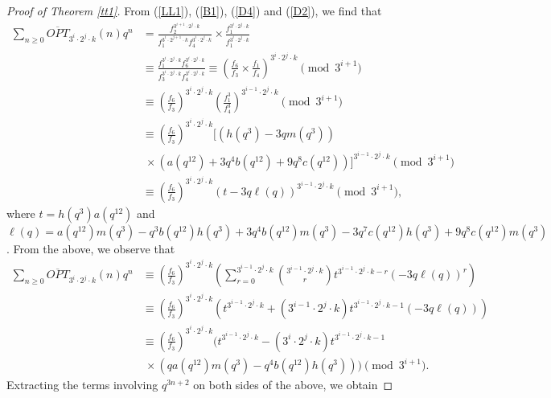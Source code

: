 \documentclass[12pt,reqno,a4paper]{amsart}
\numberwithin{equation}{section}
\begin{document}
 \begin{proof}[Proof of Theorem \ref{tt1}]
    From (\ref{LL1}), (\ref{B1}), (\ref{D4}) and (\ref{D2}), we find that
    \begin{align*}
        \sum_{n\geq 0}\overline{OPT}_{3^i\cdot 2^j\cdot k}(n)q^n&= \frac{f_2^{3^{i+1}\cdot 2^j\cdot k}}{f_1^{3^i\cdot 2^{j+1}\cdot k}f_4^{3^i\cdot 2^j\cdot k}}\times \frac{f_1^{3^i\cdot 2^{j}\cdot k}}{f_1^{3^i\cdot 2^{j}\cdot k}}\\
        &\equiv \frac{f_1^{3^i\cdot 2^{j}\cdot k}f_6^{3^{i}\cdot 2^j\cdot k}}{f_3^{3^i\cdot 2^{j}\cdot k}f_4^{3^i\cdot 2^j\cdot k}}\equiv \left(\frac{f_6}{f_3}\times \frac{f_1}{f_4}\right)^{3^{i}\cdot 2^j\cdot k}\pmod{3^{i+1}}\\
        & \equiv \left(\frac{f_6}{f_3}\right)^{3^{i}\cdot 2^j\cdot k} \left(\frac{f_1^3}{f_4^3}\right)^{3^{i-1}\cdot 2^j\cdot k}\pmod{3^{i+1}}\\
         & \equiv \left(\frac{f_6}{f_3}\right)^{3^{i}\cdot 2^j\cdot k}  \bigg[ (h(q^3)-3qm(q^3))  \\&~\times \left( a(q^{12})+3q^4b(q^{12})+9q^8c(q^{12})\right)\bigg ]^{3^{i-1}\cdot 2^j\cdot k}\pmod{3^{i+1}}\\
        & \equiv \left(\frac{f_6}{f_3}\right)^{3^{i}\cdot 2^j\cdot k} \left( t-3q\ell(q)\right)^{3^{i-1}\cdot 2^j\cdot k}\pmod{3^{i+1}},
    \end{align*}
    where $t=h(q^3)a(q^{12})$ and $\ell(q)=a(q^{12})m(q^3)-q^3b(q^{12})h(q^3)+3q^4b(q^{12})m(q^3)-3q^7c(q^{12})h(q^3)+9q^8c(q^{12})m(q^3)$. From the above, we observe that
  \begin{align}
        \sum_{n\geq 0}\overline{OPT}_{3^i\cdot 2^j\cdot k}(n)q^n&\equiv \left(\frac{f_6}{f_3}\right)^{3^{i}\cdot 2^j\cdot k}\left(\sum_{r=0}^{3^{i-1}\cdot 2^j\cdot k}\binom{3^{i-1}\cdot 2^j\cdot k}{r}t^{3^{i-1}\cdot 2^j\cdot k-r}(-3q\ell(q))^r\right)\nonumber\\
         & \equiv \left(\frac{f_6}{f_3}\right)^{3^{i}\cdot 2^j\cdot k}\left( t^{3^{i-1}\cdot 2^j\cdot k}+(3^{i-1}\cdot 2^j\cdot k)t^{3^{i-1}\cdot 2^j\cdot k-1}(-3q\ell(q))\right)\nonumber\\
         & \equiv \left(\frac{f_6}{f_3}\right)^{3^{i}\cdot 2^j\cdot k} \biggl(t^{3^{i-1}\cdot 2^j\cdot k}-(3^{i}\cdot 2^j\cdot k)t^{3^{i-1}\cdot 2^j\cdot k-1}\nonumber\\ &~\times\left(qa(q^{12})m(q^3)-q^4b(q^{12})h(q^3)\right)\biggr)\pmod{3^{i+1}}.\label{R2}
        \end{align}
    Extracting the terms involving $q^{3n+2}$ on both sides of the above, we obtain

\end{proof}
\end{document}
